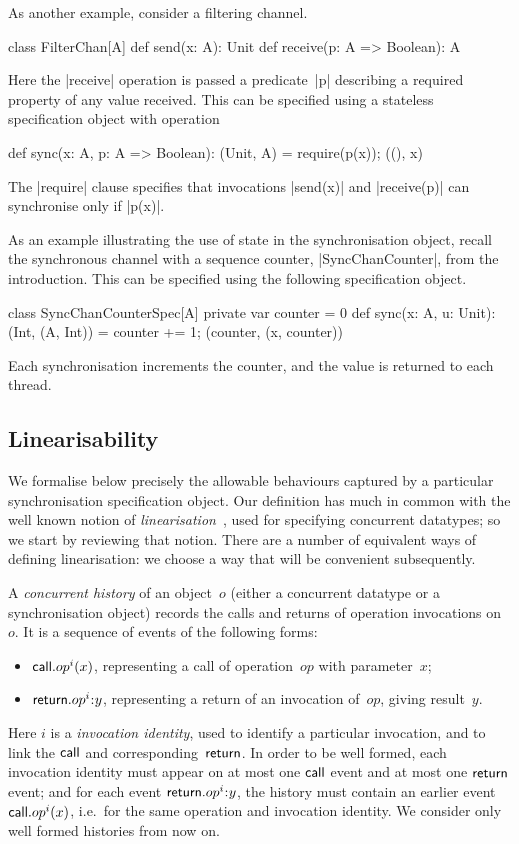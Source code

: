 As another example, consider a filtering channel.
\begin{scala}
class FilterChan[A]{
  def send(x: A): Unit
  def receive(p: A => Boolean): A
}
\end{scala}
%
Here the |receive| operation is passed a predicate~|p| describing a required
property of any value received.  This can be specified using a stateless
specification object with operation
%
\begin{scala}
def sync(x: A, p: A => Boolean): (Unit, A) = { require(p(x)); ((), x) }
\end{scala}
%
The |require| clause specifies that invocations |send(x)| and |receive(p)| can
synchronise only if |p(x)|.

As an example illustrating the use of state in the synchronisation object,
recall the synchronous channel with a sequence counter, |SyncChanCounter|,
from the introduction.  This can be specified using the following
specification object.
%
\begin{scala}
class SyncChanCounterSpec[A]{
  private var counter = 0
  def sync(x: A, u: Unit): (Int, (A, Int)) = {
    counter += 1; (counter, (x, counter))
  }
}
\end{scala}
%
Each synchronisation increments the counter, and the value is returned to each
thread. 


\subsection{Linearisability}
\label{sec:specification-linearisability}

We formalise below precisely the allowable behaviours captured by a particular
synchronisation specification object.  Our definition has much in common with
the well known notion of \emph{linearisation}~\cite{herlihy-wing}, used for
specifying concurrent datatypes; so we start by reviewing that notion.  There
are a number of equivalent ways of defining linearisation: we choose a way
that will be convenient subsequently.

A \emph{concurrent history} of an object~$o$ (either a concurrent datatype or
a synchronisation object) records the calls and returns of operation
invocations on~$o$.  It is a sequence of events of the following forms:
%
\begin{itemize}
\item $\mathsf{call}.op^i(x)$, representing a call of operation~$op$ with
  parameter~$x$;
\item $\return.op^i \:: y$, representing a return of an invocation of~$op$,
  giving result~$y$.
\end{itemize}
%
Here $i$ is a \emph{invocation identity}, used to identify a particular
invocation, and to link the $\mathsf{call}$ and corresponding~$\mathsf{return}$.  In order to
be well formed, each invocation identity must appear on at most one $\mathsf{call}$
event and at most one $\mathsf{return}$ event; and for each event $\return.op^i\::y$,
the history must contain an earlier event $\mathsf{call}.op^i(x)$, i.e.~for the same
operation and invocation identity.  We consider only well formed histories
from now on.  

